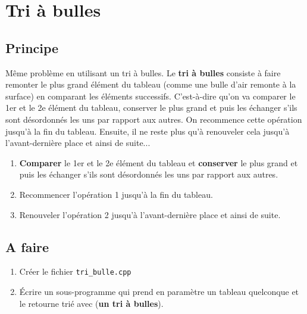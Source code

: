 \documentclass[french]{article}
\begin{document}
\section{Tri à bulles}

\subsection*{Principe}
Même problème en utilisant un tri à bulles. Le \textbf{tri à bulles} consiste à faire remonter le plus grand élément du tableau (comme une bulle d'air remonte à la surface) en comparant les éléments successifs. C'est-à-dire qu'on va comparer le 1er et le 2e élément du tableau, conserver le plus grand et puis les échanger s'ils sont désordonnés les uns par rapport aux autres. On recommence cette opération jusqu'à la fin du tableau. Ensuite, il ne reste plus qu'à renouveler cela jusqu'à l'avant-dernière place et ainsi de suite...

\begin{enumerate}
	\item \textbf{Comparer} le 1er et le 2e élément du tableau et \textbf{conserver} le plus grand et puis les échanger s'ils sont désordonnés les uns par rapport aux autres.
	\item Recommencer l'opération 1 jusqu'à la fin du tableau.
	\item Renouveler l'opération 2 jusqu'à l'avant-dernière place et ainsi de suite.
\end{enumerate} 
\subsection*{A faire}
\begin{enumerate}
\item Créer le fichier \texttt{tri\_bulle.cpp}
\item Écrire un sous-programme qui prend en paramètre un tableau quelconque et le retourne trié avec (\textbf{un tri à bulles}).
\end{enumerate}
\end{document}
